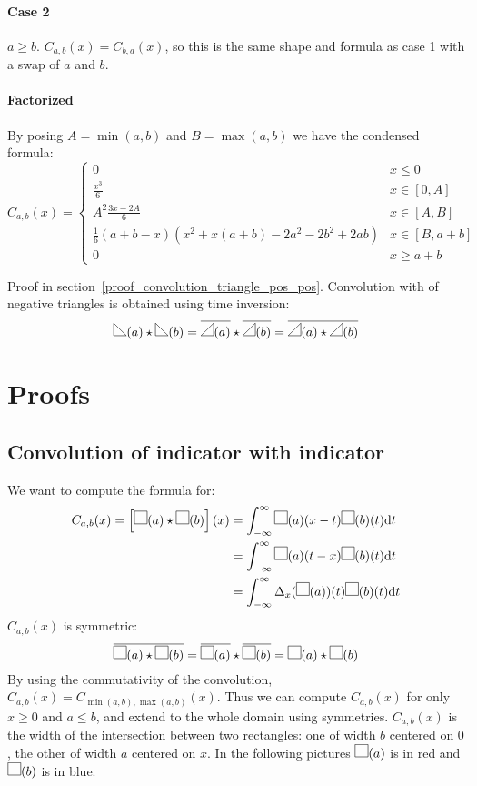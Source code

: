\documentclass[a4paper,10pt]{article}
\newcommand\Shifted[2]{\Delta_{#1}(#2)}
\newcommand\Reversed[1]{\overline{#1}}
\newcommand\SymSquare{\begin{tikzpicture}%
        \draw (0,0) -- (0,1em) -- (1em,1em) -- (1em,0) -- cycle;
\end{tikzpicture}}
\newcommand\Indicator[1]{\SymSquare(#1)}
\newcommand\SymPositiveTriangle{\begin{tikzpicture}%
        \draw (0,0) -- (1em,0em) -- (1em,1em) -- cycle;
\end{tikzpicture}}
\newcommand\PositiveTriangle[1]{\SymPositiveTriangle(#1)}
\newcommand\SymNegativeTriangle{\begin{tikzpicture}%
        \draw (0,0) -- (0,1em) -- (1em,0em) -- cycle;
\end{tikzpicture}}
\newcommand\NegativeTriangle[1]{\SymNegativeTriangle(#1)}
\newcommand\D{\mathrm{d}}
\newcommand\Convolution{\star}
\newcommand\ConvolutionInt[2]{\int_{-\infty}^{\infty}#1 \D#2}
\begin{document}
\paragraph{Case 2}
$a \ge b$.
$C_{a,b}(x) = C_{b,a}(x)$, so this is the same shape and formula as case 1 with a swap of $a$ and $b$.

\paragraph{Factorized}
By posing $A=\min(a,b)$ and $B=\max(a,b)$ we have the condensed formula:
\[ C_{a,b}(x) = \begin{cases}
    0 & x \le 0 \\
    \frac{x^3}{6} & x \in [0, A] \\
    A^2 \frac{3x-2A}{6} & x \in [A, B] \\
    \frac{1}{6} (a+b-x) (x^2 + x(a+b) -2a^2-2b^2+2ab) & x \in [B, a+b] \\
    0 & x \ge a+b
\end{cases} \]

Proof in section~\ref{proof_convolution_triangle_pos_pos}.
Convolution with of negative triangles is obtained using time inversion:
\[
    \NegativeTriangle{a} \Convolution \NegativeTriangle{b} =
    \Reversed{\PositiveTriangle{a}} \Convolution \Reversed{\PositiveTriangle{b}} =
    \Reversed{\PositiveTriangle{a} \Convolution \PositiveTriangle{b}}
\]

\section{Proofs}

\subsection{Convolution of indicator with indicator}\label{proof_convolution_indicator_indicator}

We want to compute the formula for:
\[ \begin{split}
    C_{a,b}(x) = \left[ \Indicator{a} \Convolution \Indicator{b} \right] (x) & = \ConvolutionInt{\Indicator{a}(x-t) \Indicator{b}(t)}{t} \\
    & = \ConvolutionInt{\Indicator{a}(t-x) \Indicator{b}(t)}{t} \\
    & = \ConvolutionInt{\Shifted{x}{\Indicator{a}}(t) \Indicator{b}(t)}{t}
\end{split} \]
$C_{a,b}(x)$ is symmetric:
\[
    \Reversed{\Indicator{a} \Convolution \Indicator{b}} =
    \Reversed{\Indicator{a}} \Convolution \Reversed{\Indicator{b}} =
    \Indicator{a} \Convolution \Indicator{b}
\]
By using the commutativity of the convolution, $C_{a,b}(x) = C_{\min(a,b),\max(a,b)}(x)$.
Thus we can compute $C_{a,b}(x)$ for only $x \ge 0$ and $a \le b$, and extend to the whole domain using symmetries.
$C_{a,b}(x)$ is the width of the intersection between two rectangles: one of width $b$ centered on $0$, the other of width $a$ centered on $x$.
In the following pictures $\Indicator{a}$ is in red and $\Indicator{b}$ is in blue.
\end{document}
